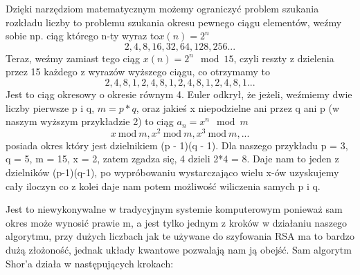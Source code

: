 \documentclass[12pt, letterpaper]{article}
\newcommand{\Mod}[1]{\ \mathrm{mod}\ #1}
\begin{document}
Dzięki narzędziom matematycznym możemy ograniczyć problem szukania rozkładu liczby to problemu szukania okresu pewnego ciągu elementów, weźmy sobie np. ciąg którego n-ty wyraz to$x(n) = 2^n$
\[2, 4, 8, 16, 32, 64, 128, 256 ...\]
Teraz, weźmy zamiast tego ciąg $x(n) = 2^n \mod 15$, czyli reszty z dzielenia przez 15 każdego z wyrazów wyższego ciągu, co otrzymamy to
\[2, 4, 8, 1, 2, 4, 8, 1, 2, 4, 8, 1, 2, 4, 8, 1 ...\]
\newpage
Jest to ciąg okresowy o okresie równym 4. 
Euler odkrył, że jeżeli, weźmiemy dwie liczby pierwsze p i q, $m = p*q$, oraz jakieś x niepodzielne ani przez q ani p (w naszym wyższym przykładzie 2) to ciąg $a_n = x^n \mod m$
\[x \Mod{m}, x^2 \Mod{m}, x^3 \Mod{m}, ...\]
posiada okres który jest dzielnikiem (p - 1)(q - 1).
Dla naszego przykładu p = 3, q = 5, m = 15, x = 2, zatem zgadza się, 4 dzieli 2*4 = 8.
Daje nam to jeden z dzielników (p-1)(q-1), po wypróbowaniu wystarczająco wielu x-ów uzyskujemy cały iloczyn co z kolei daje nam potem możliwość wiliczenia samych p i q.

Jest to niewykonywalne w tradycyjnym systemie komputerowym ponieważ sam okres może wynosić prawie m, a jest tylko jednym z kroków w działaniu naszego algorytmu, przy dużych liczbach jak te używane do szyfowania RSA ma to bardzo dużą złożoność, jednak układy kwantowe pozwalają nam ją obejść.
\newpage
Sam algorytm Shor'a działa w następujących krokach: 
\end{document}
